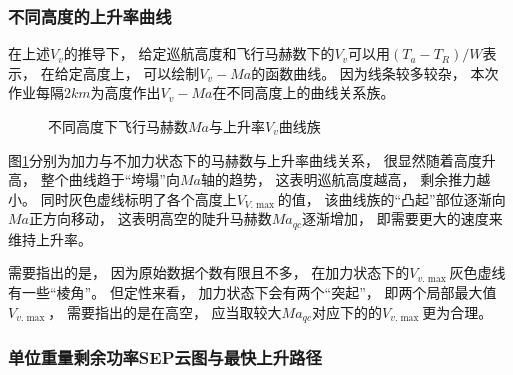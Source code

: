 \subsubsection{不同高度的上升率曲线}

在上述$V_v$的推导下，
给定巡航高度和飞行马赫数下的$V_v$可以用$(T_a-T_R)/W$表示，
在给定高度上，
可以绘制$V_v-Ma$的函数曲线。
因为线条较多较杂，
本次作业每隔$2km$为高度作出$V_v-Ma$在不同高度上的曲线关系族。

\begin{figure}[H]
    \centering
    \caption{不同高度下飞行马赫数$Ma$与上升率$V_v$曲线族}
    \label{不同高度下飞行马赫数与上升率曲线族}
\end{figure}

图\ref{不同高度下飞行马赫数与上升率曲线族}分别为加力与不加力状态下的马赫数与上升率曲线关系，
很显然随着高度升高，
整个曲线趋于“垮塌”向$Ma$轴的趋势，
这表明巡航高度越高，
剩余推力越小。
同时灰色虚线标明了各个高度上$V_{V.\max}$的值，
该曲线族的“凸起”部位逐渐向$Ma$正方向移动，
这表明高空的陡升马赫数$Ma_{qc}$逐渐增加，
即需要更大的速度来维持上升率。

需要指出的是，
因为原始数据个数有限且不多，
在加力状态下的$V_{v.\max}$灰色虚线有一些“棱角”。
但定性来看，
加力状态下会有两个“突起”，
即两个局部最大值$V_{v.\max}$，
需要指出的是在高空，
应当取较大$Ma_{qc}$对应下的的$V_{v.\max}$更为合理。


\subsubsection{单位重量剩余功率SEP云图与最快上升路径}

